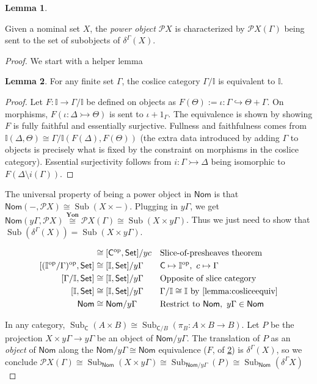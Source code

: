\documentclass{article}
\makeatletter
\newcommand{\allproofs}{} %
\newif\ifproofsinappendix
\newcommand{\lemmawithproof}[3]{%
  \begin{lemma}\label{#1}
    #2  
    \ifproofsinappendix \hyperref[xxx#1]{(Proof)} \fi
  \end{lemma}
    \ifproofsinappendix
  \g@addto@macro\allproofs{%
    \par\medskip
    \noindent
    \subsection*{\cref{#1}}\par
    #2\par
    \begin{proof}\label{xxx#1}
      #3
    \end{proof}%
  }
      \else

    \begin{proof}
      #3
    \end{proof}
    \fi 
}
\theoremstyle{definition}
\newtheorem{lemma}{Lemma}[section]
\newcommand{\II}{\mathbb{I}}
\newcommand{\cP}{\mathcal{P}}
\newcommand{\cat}[1]{\mathsf{#1}}
\newcommand{\op}{\operatorname{op}}
\newcommand{\catC}{\cat{C}}
\newcommand{\Set}{\cat{Set}}
\newcommand{\Nom}{\cat{Nom}}
\newcommand{\Sub}{\operatorname{Sub}}
\makeatother
\begin{document}
\lemmawithproof{lemma:power}{
    Given a nominal set $X$, the {\it power object} $\cP X$ is characterized by $\cP X(\Gamma)$ being sent to the set of subobjects of $\delta^\Gamma(X)$.
}{

    We start with a helper lemma 

    \begin{lemma}
    \label{lemma:cosliceequiv}
    For any finite set $\Gamma$, the coslice category $\Gamma/\II$ is equivalent to $\II$.
\end{lemma}


\begin{proof}
    Let $F\colon \II\to \Gamma/\II$ be defined on objects as $F(\Theta):=\iota\colon \Gamma \hookrightarrow \Theta+\Gamma$. 
    On morphisms, $F(\iota\colon \Delta\rightarrowtail \Theta)$ is sent to $\iota+1_\Gamma$. 
    The equivalence is shown by showing $F$ is fully faithful and essentially surjective. Fullness and faithfulness comes from  $\II(\Delta,\Theta) \cong \Gamma/\II(F(\Delta),F(\Theta))$ (the extra data introduced by adding $\Gamma$ to objects is precisely what is fixed by the constraint on morphisms in the coslice category). 
    Essential surjectivity follows from $i\colon \Gamma\rightarrowtail \Delta$ being isomorphic to $F(\Delta\setminus i(\Gamma))$. 
\end{proof}


    The universal property of being a power object in $\Nom$ is that $\Nom(-,\cP X)\cong \Sub(X\times -)$. 
    Plugging in $y\Gamma$, we get $\Nom(y\Gamma,\cP X)\overset{\mathbf{Yon}}{\cong} \cP X(\Gamma) \cong \Sub(X\times y\Gamma)$. 
    Thus we just need to show that $\Sub(\delta^\Gamma(X))=\Sub(X\times y\Gamma)$. 

    \begin{align*}
    [(\catC/c)^{\op},\Set]&\cong [\catC^{\op},\Set]/yc &&\text{Slice-of-presheaves theorem}\\
    [(\II^{\op}/\Gamma)^{\op},\Set]&\cong [\II,\Set]/y\Gamma &&\catC\mapsto \II^{\op},\ c\mapsto \Gamma\\
    [\Gamma/\II,\Set]&\cong [\II,\Set]/y\Gamma &&\text{Opposite of slice category}\\
    [\II,\Set]&\cong [\II,\Set]/y\Gamma &&\Gamma/\II\cong \II\text{ by \cref{lemma:cosliceequiv}}\\
    \Nom&\cong \Nom/y\Gamma &&\text{Restrict to }\Nom,\ y\Gamma \in \Nom\\
\end{align*}

In any category, $\Sub_\catC(A\times B) \cong \Sub_{\catC/B}(\pi_B\colon A\times B\to B)$. 
Let $P$ be the projection $X\times y\Gamma\to y\Gamma$ be an object of $\Nom/y\Gamma$. 
The translation of $P$ as an {\it object} of $\Nom$ along the $\Nom/y\Gamma\cong \Nom$ equivalence ($F$, of \cref{lemma:cosliceequiv}) is $\delta^\Gamma(X)$, so we conclude $\cP X(\Gamma)\cong\Sub_\Nom(X\times y\Gamma) \cong \Sub_{\Nom/y\Gamma}(P) \cong \Sub_\Nom(\delta^\Gamma X)$

}
\end{document}
